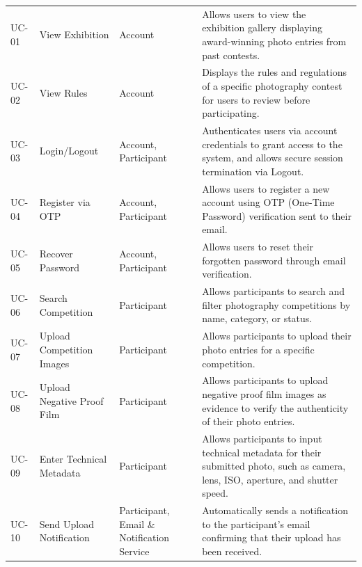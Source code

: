 \vspace{0.5em}
\renewcommand{\arraystretch}{1.15}
\setlength{\tabcolsep}{4pt}
\small
\begin{longtable}{|>{\centering\arraybackslash}p{}|>{\raggedright\arraybackslash}p{}|>{\raggedright\arraybackslash}p{}|>{\raggedright\arraybackslash}p{}|}
\hline
\multicolumn{1}{|c|}{\textbf{ID}} & \multicolumn{1}{c|}{\textbf{Use Case}} & \multicolumn{1}{c|}{\textbf{Actors}} & \multicolumn{1}{c|}{\textbf{Use Case Description}} \\
\hline
UC-01 & View Exhibition & Account & Allows users to view the exhibition gallery displaying award-winning photo entries from past contests. \\
\hline
UC-02 & View Rules & Account & Displays the rules and regulations of a specific photography contest for users to review before participating. \\
\hline
UC-03 & Login/Logout & Account, Participant & Authenticates users via account credentials to grant access to the system, and allows secure session termination via Logout. \\
\hline
UC-04 & Register via OTP & Account, Participant & Allows users to register a new account using OTP (One-Time Password) verification sent to their email. \\
\hline
UC-05 & Recover Password & Account, Participant & Allows users to reset their forgotten password through email verification. \\
\hline
UC-06 & Search Competition & Participant & Allows participants to search and filter photography competitions by name, category, or status. \\
\hline
UC-07 & Upload Competition Images & Participant & Allows participants to upload their photo entries for a specific competition. \\
\hline
UC-08 & Upload Negative Proof Film & Participant & Allows participants to upload negative proof film images as evidence to verify the authenticity of their photo entries. \\
\hline
UC-09 & Enter Technical Metadata & Participant & Allows participants to input technical metadata for their submitted photo, such as camera, lens, ISO, aperture, and shutter speed. \\
\hline
UC-10 & Send Upload Notification & Participant, Email \& Notification Service & Automatically sends a notification to the participant's email confirming that their upload has been received. \\

\end{longtable}
